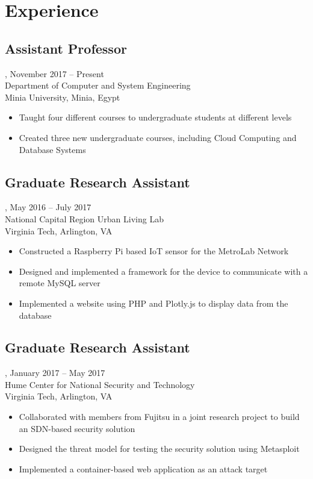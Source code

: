 \section{Experience}
\subsection{Assistant Professor}, November 2017 -- Present\\
Department of Computer and System Engineering\\
Minia University, Minia, Egypt
\begin{itemize}
    \item Taught four different courses to undergraduate students at different levels
    \item Created three new undergraduate courses, including Cloud Computing and Database Systems
    
    
\end{itemize}

\subsection{Graduate Research Assistant}, May 2016 -- July 2017\\
National Capital Region Urban Living Lab\\
Virginia Tech, Arlington, VA
\begin{itemize}
\item Constructed a Raspberry Pi based IoT sensor for the MetroLab Network
\item Designed and implemented a framework for the device to communicate with a remote MySQL server
\item Implemented a website using PHP and Plotly.js to display data from the database
\end{itemize}

\subsection{Graduate Research Assistant}, January 2017 -- May 2017\\
Hume Center for National Security and Technology\\
Virginia Tech, Arlington, VA
\begin{itemize}
\item Collaborated with members from Fujitsu in a joint research project to build an SDN-based security solution
\item Designed the threat model for testing the security solution using Metasploit
\item Implemented a container-based web application as an attack target
\end{itemize}


